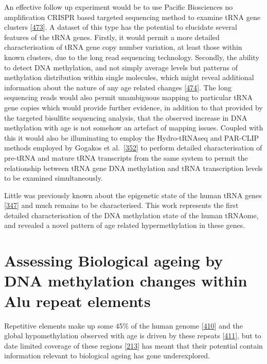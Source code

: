 \documentclass[
]{book}
\begin{document}
An effective follow up experiment would be to use Pacific Biosciences no amplification CRISPR based targeted sequencing method to examine tRNA gene clusters {[}\protect\hyperlink{ref-Wieben2019}{473}{]}.
A dataset of this type has the potential to elucidate several features of the tRNA genes.
Firstly, it would permit a more detailed characterisation of tRNA gene copy number variation, at least those within known clusters, due to the long read sequencing technology.
Secondly, the ability to detect DNA methylation, and not simply average levels but patterns of methylation distribution within single molecules, which might reveal additional information about the nature of any age related changes {[}\protect\hyperlink{ref-Flusberg2010}{474}{]}.
The long sequencing reads would also permit unambiguous mapping to particular tRNA gene copies which would provide further evidence, in addition to that provided by the targeted bisulfite sequencing analysis, that the observed increase in DNA methylation with age is not somehow an artefact of mapping issues.
Coupled with this it would also be illuminating to employ the Hydro-tRNAseq and PAR-CLIP methods employed by Gogakos et al.~{[}\protect\hyperlink{ref-Gogakos2017}{352}{]} to perform detailed characterisation of pre-tRNA and mature tRNA transcripts from the same system to permit the relationship between tRNA gene DNA methylation and tRNA transcription levels to be examined simultaneously.

Little was previously known about the epigenetic state of the human tRNA genes {[}\protect\hyperlink{ref-Bhargava2013a}{347}{]} and much remains to be characterised.
This work represents the first detailed characterisation of the DNA methylation state of the human tRNAome, and revealed a novel pattern of age related hypermethylation in these genes.

\hypertarget{assessing-biological-ageing-by-dna-methylation-changes-within-alu-repeat-elements}{%
\section{Assessing Biological ageing by DNA methylation changes within Alu repeat elements}\label{assessing-biological-ageing-by-dna-methylation-changes-within-alu-repeat-elements}}

Repetitive elements make up some 45\% of the human genome {[}\protect\hyperlink{ref-Jorda2017}{410}{]} and the global hypomethylation observed with age is driven by these repeats {[}\protect\hyperlink{ref-Bollati2010}{411}{]}, but to date limited coverage of these regions {[}\protect\hyperlink{ref-Clark2012}{213}{]} has meant that their potential contain information relevant to biological ageing has gone underexplored.
\end{document}

